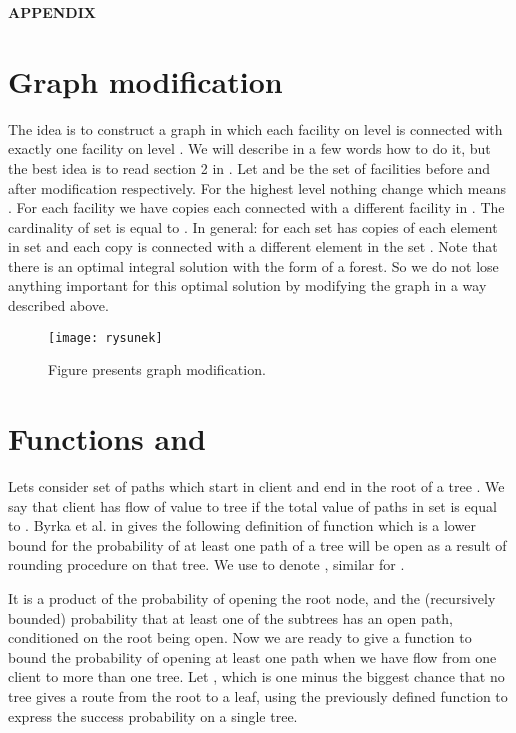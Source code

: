 \documentclass{llncs}
\begin{document}
\newpage
{\large \bf APPENDIX}
\begin{appendix}

\section{Graph modification} \label{sec:modiffication}
The idea is to construct a graph in which each facility on level  is connected with exactly one facility on level . We will describe in a few words how to do it, but the best idea is to read section 2 in \cite{Rybicki}. Let  and  be the set of facilities before and after modification respectively. For the highest level nothing change which means . For each facility  we have  copies each connected with a different facility in . The cardinality of set  is equal to . In general: for each  set  has  copies of each element in set  and each copy is connected with a different element in the set . Note that there is an optimal integral solution with the form of a forest. So we do not lose anything important for this optimal solution by modifying the graph in a way described above.

\begin{figure}
  \centering
  \texttt{[image: rysunek]}
  \caption{Figure presents graph modification.}
\end{figure}

\section{Functions  and }\label{sec:functions of probability}
Lets consider set  of paths which start in client  and end in the root of a tree . We say that client  has flow of value  to tree  if the total value of paths in set  is equal to . Byrka et al. in \cite{Rybicki} gives the following definition of function which is a lower bound for the probability of at least one path of a tree will be open as a result of rounding procedure on that tree. We use  to denote , similar for .



It is a product of the probability of opening the root node, and the (recursively bounded) probability that at least one of the subtrees has an open path, conditioned on the root being open. Now we are ready to give a function  to bound the probability of opening at least one path when we have flow  from one client to more than one tree. Let , which is one minus the biggest chance that no tree gives a route from the root to a leaf, using the previously defined  function to express the success probability on a single tree.


\end{appendix}
\end{document}
